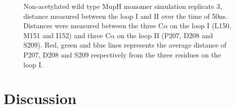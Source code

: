 		\setlength\fboxsep{5pt}
		\setlength\fboxrule{1.5pt}
		\begin{figure}[htbp]
		\centering
		\caption[Non-acetylated wild type MupH monomer simulation replicate 3, distance measured between the loop I and II over the time of 50ns.]{Non-acetylated wild type MupH monomer simulation replicate 3, distance measured between the loop I and II over the time of 50ns. Distances were measured between the three C$ \alpha $ on the loop I (L150, M151 and I152) and three C$ \alpha $ on the loop II (P207, D208 and S209). Red, green and blue lines represents the average distance of P207, D208 and S209 respectively from the three residues on the loop I.}
		\label{fig:MuphSim2}
		\end{figure}					
		

%

\newpage		
\section{Discussion}
\label{sec:chap6Discussion}

